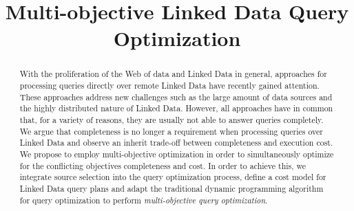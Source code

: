 \documentclass{sig-alternate}
\title{Multi-objective Linked Data Query Optimization}
\author{
}
\begin{document}
\maketitle
\begin{abstract} 
  With the proliferation of the Web of data and Linked Data in
  general, approaches for processing queries directly over remote
  Linked Data have recently gained attention. These approaches address
  new challenges such as the large amount of data sources and the
  highly distributed nature of Linked Data. However, all approaches
  have in common that, for a variety of reasons, they are usually not
  able to answer queries completely. We argue that completeness is no
  longer a requirement when processing queries over Linked Data and
  observe an inherit trade-off between completeness and execution
  cost. We propose to employ multi-objective optimization in order to
  simultaneously optimize for the conflicting objectives completeness
  and cost. In order to achieve this, we integrate source selection
  into the query optimization process, define a cost model for Linked
  Data query plans and adapt the traditional dynamic programming
  algorithm for query optimization to perform \emph{multi-objective
    query optimization}. 

\end{abstract}





%








\end{document}
